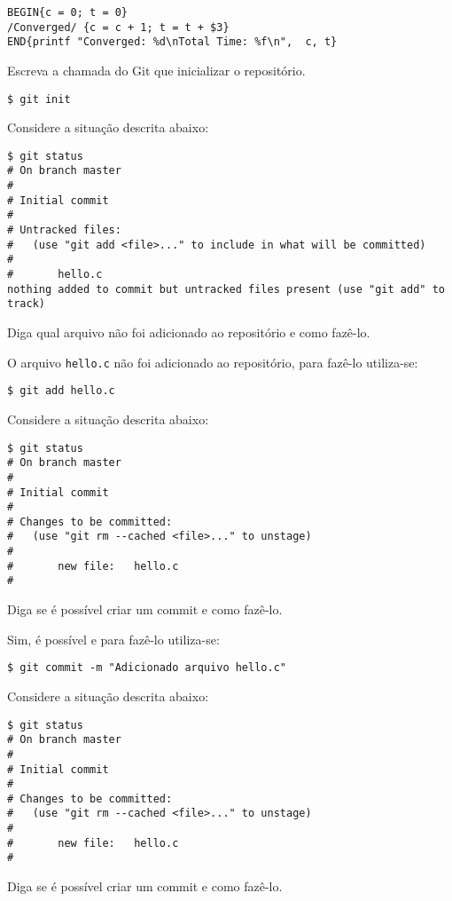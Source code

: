 \begin{Answer}[ref={007}]
  \begin{lstlisting}
BEGIN{c = 0; t = 0}
/Converged/ {c = c + 1; t = t + $3}
END{printf "Converged: %d\nTotal Time: %f\n",  c, t}
  \end{lstlisting}
\end{Answer}
\begin{Exercise}[label={0008}, difficulty={1}, origin={git}]
  Escreva a chamada do Git que inicializar o repositório.
\end{Exercise}

\begin{Answer}[ref={0008}]
  \begin{lstlisting}
$ git init
  \end{lstlisting}
\end{Answer}
\begin{Exercise}[label={0009}, difficulty={1}, origin={git}]
  Considere a situação descrita abaixo:
  \begin{lstlisting}
$ git status
# On branch master
#
# Initial commit
#
# Untracked files:
#   (use "git add <file>..." to include in what will be committed)
#
#       hello.c
nothing added to commit but untracked files present (use "git add" to track)
  \end{lstlisting}
  Diga qual arquivo não foi adicionado ao repositório e como fazê-lo.
\end{Exercise}

\begin{Answer}[ref={0009}]
  O arquivo \verb+hello.c+ não foi adicionado ao repositório, para fazê-lo
  utiliza-se:
  \begin{lstlisting}
$ git add hello.c
  \end{lstlisting}
\end{Answer}
\begin{Exercise}[label={0010}, difficulty={1}, origin={git}]
  Considere a situação descrita abaixo:
  \begin{lstlisting}
$ git status
# On branch master
#
# Initial commit
#
# Changes to be committed:
#   (use "git rm --cached <file>..." to unstage)
#
#       new file:   hello.c
#
  \end{lstlisting}
  Diga se é possível criar um commit e como fazê-lo.
\end{Exercise}

\begin{Answer}[ref={0010}]
  Sim, é possível e para fazê-lo utiliza-se:
  \begin{lstlisting}
$ git commit -m "Adicionado arquivo hello.c"
  \end{lstlisting}
\end{Answer}
\begin{Exercise}[label={0011}, difficulty={1}, origin={git}]
  Considere a situação descrita abaixo:
  \begin{lstlisting}
$ git status
# On branch master
#
# Initial commit
#
# Changes to be committed:
#   (use "git rm --cached <file>..." to unstage)
#
#       new file:   hello.c
#
  \end{lstlisting}
  Diga se é possível criar um commit e como fazê-lo.
\end{Exercise}

